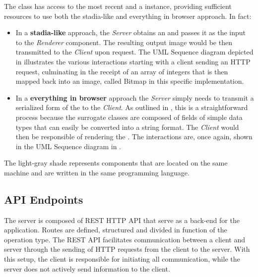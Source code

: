 The  class has access to the most recent  and a  instance, providing sufficient resources to use both the stadia-like and everything in browser approach. In fact:
\begin{itemize}
	\item In a \textbf{stadia-like} approach, the \textit{Server} obtains an  and passes it as the input to the \textit{Renderer} component. The resulting output image would be then transmitted to the \textit{Client} upon request.
	The UML Sequence diagram depicted in  illustrates the various interactions starting with a client sending an HTTP request, culminating in the receipt of an array of integers that is then mapped back into an image, called Bitmap in this specific implementation.


	\item In a \textbf{everything in browser} approach the \textit{Server} simply needs to transmit a serialized form of the  to the \textit{Client}. As outlined in , this is a straightforward process because the surrogate classes are composed of fields of simple data types that can easily be converted into a string format. The \textit{Client} would then be responsible of rendering the . The interactions are, once again, shown in the UML Sequence diagram in .

\end{itemize}
The light-gray shade represents components that are located on the same machine and are written in the same programming language.
\subsection{API Endpoints}
\label{ssec:api-endpoints}
The server is composed of REST HTTP API that serve as a back-end for the application. Routes are defined, structured and divided in function of the operation type. The REST API facilitates communication between a client and server through the sending of HTTP requests from the client to the server. With this setup, the client is responsible for initiating all communication, while the server does not actively send information to the client.\newline

